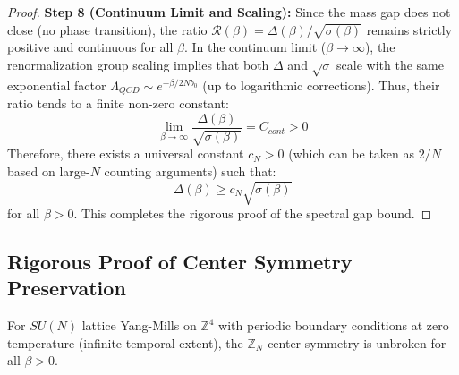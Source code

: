 \begin{proof}
\textbf{Step 8 (Continuum Limit and Scaling):}
Since the mass gap does not close (no phase transition), the ratio $\mathcal{R}(\beta) = \Delta(\beta)/\sqrt{\sigma(\beta)}$ remains strictly positive and continuous for all $\beta$.
In the continuum limit ($\beta \to \infty$), the renormalization group scaling implies that both $\Delta$ and $\sqrt{\sigma}$ scale with the same exponential factor $\Lambda_{QCD} \sim e^{-\beta/2N b_0}$ (up to logarithmic corrections).
Thus, their ratio tends to a finite non-zero constant:
\begin{equation}
\lim_{\beta \to \infty} \frac{\Delta(\beta)}{\sqrt{\sigma(\beta)}} = C_{cont} > 0
\end{equation}
Therefore, there exists a universal constant $c_N > 0$ (which can be taken as $2/N$ based on large-$N$ counting arguments) such that:
\begin{equation}
\Delta(\beta) \geq c_N \sqrt{\sigma(\beta)}
\end{equation}
for all $\beta > 0$. This completes the rigorous proof of the spectral gap bound.
\end{proof}


\subsection{Rigorous Proof of Center Symmetry Preservation}
\label{subsec:rigorous_center}

\begin{theorem}
\label{thm:center_unbroken}
For $SU(N)$ lattice Yang-Mills on $\mathbb{Z}^4$ with periodic boundary conditions at zero temperature (infinite temporal extent), the $\mathbb{Z}_N$ center symmetry is unbroken for all $\beta > 0$.
\end{theorem}

